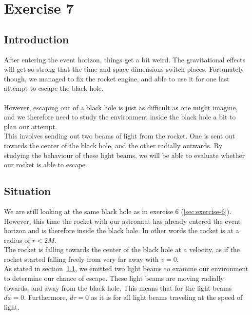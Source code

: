 \documentclass[reprint,english,notitlepage]{revtex4-2}
\begin{document}
\newpage
\section{Exercise 7}\label{sec:exercise-7}
    \subsection{Introduction}\label{subsec:introduction7}
        After entering the event horizon, things get a bit weird.
        The gravitational effects will get so strong that the time and space dimensions switch places.
        Fortunately though, we managed to fix the rocket engine, and able to use it for one last attempt to escape the black hole.\\\\
        However, escaping out of a black hole is just as difficult as one might imagine, and we therefore need to study the environment inside the black hole a bit to plan our attempt.\\
        This involves sending out two beams of light from the rocket.
        One is sent out towards the center of the black hole, and the other radially outwards.
        By studying the behaviour of these light beams, we will be able to evaluate whether our rocket is able to escape.

    \subsection{Situation}\label{subsec:situation7}
        We are still looking at the same black hole as in exercise 6 (\ref{sec:exercise-6}).
        However, this time the rocket with our astronaut has already entered the event horizon and is therefore inside the black hole.
        In other words the rocket is at a radius of $r < 2M$.\\
        The rocket is falling towards the center of the black hole at a velocity, as if the rocket started falling freely from very far away with $v = 0$.\\
        As stated in section~\ref{subsec:introduction7}, we emitted two light beams to examine our environment to determine our chance of escape.
        These light beams are moving radially towards, and away from the black hole.
        This means that for the light beams $d\phi = 0$.
        Furthermore, $d\tau = 0$ as it is for all light beams traveling at the speed of light.
\end{document}
